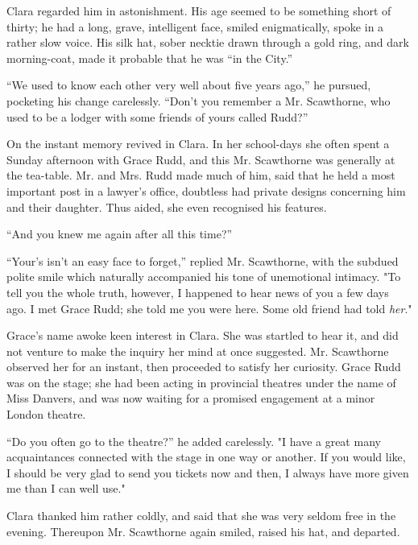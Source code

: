 Clara regarded him in astonishment. His age seemed to be something short
of thirty; he had a long, grave, intelligent face, smiled enigmatically,
spoke in a rather slow voice. His silk hat, sober necktie drawn through
a gold ring, and dark morning-coat, made it probable that he was ``in
the City.''

``We used to know each other very well about five years ago,'' he
pursued, pocketing his change carelessly. ``Don't you remember a Mr.
Scawthorne, who used to be a lodger with some friends of yours called
Rudd?''

On the instant memory revived in Clara. In her school-days she often
spent a Sunday afternoon with Grace Rudd, and this Mr. Scawthorne was
generally at the tea-table. Mr. and Mrs. Rudd made much of him, said
that he held a most important post in a lawyer's office, doubtless had
private designs concerning him and their daughter. Thus aided, she even
recognised his features.

{\protect\hypertarget{206}{}{}}``And you knew me again after all this
time?''

``Your's isn't an easy face to forget,'' replied Mr. Scawthorne, with
the subdued polite smile which naturally accompanied his tone of
unemotional intimacy. "To tell you the whole truth, however, I happened
to hear news of you a few days ago. I met Grace Rudd; she told me you
were here. Some old friend had told \emph{her}."

Grace's name awoke keen interest in Clara. She was startled to hear it,
and did not venture to make the inquiry her mind at once suggested. Mr.
Scawthorne observed her for an instant, then proceeded to satisfy her
curiosity. Grace Rudd was on the stage; she had been acting in
provincial theatres under the name of Miss Danvers, and was now waiting
for a promised engagement at a minor London theatre.

``Do you often go to the theatre?'' he added carelessly. "I have a great
many acquaintances connected with the stage in one way or another. If
you would like, I should be {\protect\hypertarget{207}{}{}}very glad to
send you tickets now and then, I always have more given me than I can
well use."

Clara thanked him rather coldly, and said that she was very seldom free
in the evening. Thereupon Mr. Scawthorne again smiled, raised his hat,
and departed.

